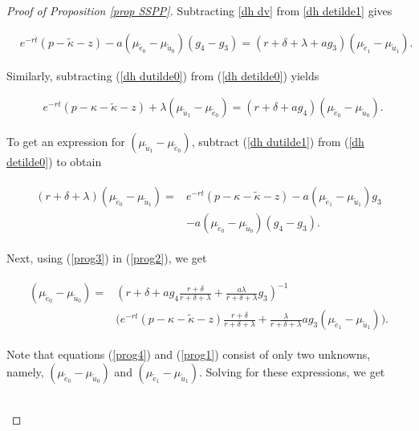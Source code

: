 \documentclass[12pt]{article} %
\theoremstyle{definition}
\begin{document}
\begin{proof}[Proof of Proposition \ref{prop SSPP}]
\noindent Subtracting \eqref{dh dv} from \eqref{dh detilde1} gives

\begin{fleqn}
\begin{align}
& e^{-rt}(p-\tilde{\kappa}-z)-a(\mu_{\tilde{e}_0}-\mu_{\tilde{u}_0})(g_4-g_3)=(r+\delta+\lambda+ag_3)(\mu_{\tilde{e}_1}-\mu_{\tilde{u}_1}). \label{prog1}
\end{align}
\end{fleqn}
Similarly, subtracting (\ref{dh dutilde0}) from (\ref{dh detilde0}) yields
\begin{fleqn}
\begin{align}
& e^{-rt}(p-\kappa-\tilde{\kappa}-z)+\lambda(\mu_{\tilde{u}_1}-\mu_{\tilde{e}_0})=(r+\delta+ag_4)(\mu_{\tilde{e}_0}-\mu_{\tilde{u}_0}). \label{prog2}
\end{align}
\end{fleqn}
To get an expression for $(\mu_{\tilde{u}_1}-\mu_{\tilde{e}_0})$, subtract (\ref{dh dutilde1}) from (\ref{dh detilde0}) to obtain
\begin{fleqn}
\begin{align}
\begin{split}
(r+\delta+\lambda)(\mu_{\tilde{e}_0}-\mu_{\tilde{u}_1})= & e^{-rt}(p-\kappa-\tilde{\kappa}-z)-a(\mu_{\tilde{e}_1}-\mu_{\tilde{u}_1})g_3\\
& -a(\mu_{\tilde{e}_0}-\mu_{\tilde{u}_0})(g_4-g_3). \label{prog3}
\end{split}
\end{align}
\end{fleqn}
Next, using (\ref{prog3}) in (\ref{prog2}), we get
\begin{fleqn}
\begin{align}
\begin{split}
(\mu_{\tilde{e}_0}-\mu_{\tilde{u}_0})=& \left(r+\delta+ag_4\frac{r+\delta}{r+\delta+\lambda}+\frac{a\lambda}{r+\delta+\lambda}g_3\right)^{-1}\\
&\biggl(e^{-rt}(p-\kappa-\tilde{\kappa}-z)\frac{r+\delta}{r+\delta+\lambda} +\frac{\lambda}{r+\delta+\lambda}ag_3(\mu_{\tilde{e}_1}-\mu_{\tilde{u}_1})\biggr). \label{prog4}
\end{split}
\end{align}
\end{fleqn}
Note that equations (\ref{prog4}) and (\ref{prog1}) consist of only two unknowns, namely, $(\mu_{\tilde{e}_0}-\mu_{\tilde{u}_0})$ and $(\mu_{\tilde{e}_1}-\mu_{\tilde{u}_1})$. Solving for these expressions, we get
\begin{fleqn}
\begin{align}

\end{align}
\end{fleqn}
\end{proof}
\end{document}
